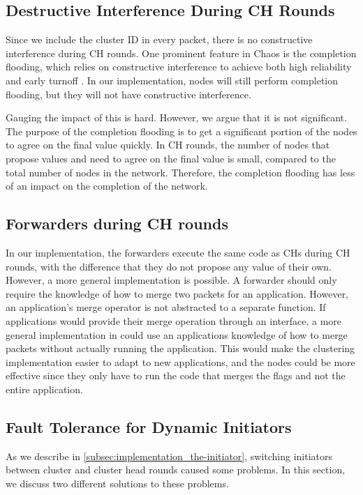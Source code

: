 \subsection{Destructive Interference During CH Rounds}
Since we include the cluster ID in every packet, there is no constructive interference during CH rounds. One prominent feature in Chaos is the completion flooding, which relies on constructive interference to achieve both high reliability and early turnoff \cite{chaos-introduction-paper}. In our implementation, nodes will still perform completion flooding, but they will not have constructive interference. 

Gauging the impact of this is hard. However, we argue that it is not significant. The purpose of the completion flooding is to get a significant portion of the nodes to agree on the final value quickly. In CH rounds, the number of nodes that propose values and need to agree on the final value is small, compared to the total number of nodes in the network. Therefore, the completion flooding has less of an impact on the completion of the network.

\subsection{Forwarders during CH rounds}
In our implementation, the forwarders execute the same code as CHs during CH rounds, with the difference that they do not propose any value of their own. However, a more general implementation is possible. A forwarder should only require the knowledge of how to merge two packets for an application. However, an application's merge operator is not abstracted to a separate function. If applications would provide their merge operation through an interface, a more general implementation in \atwo{} could use an applications knowledge of how to merge packets without actually running the application. This would make the clustering implementation easier to adapt to new applications, and the nodes could be more effective since they only have to run the code that merges the flags and not the entire application.


\subsection{Fault Tolerance for Dynamic Initiators}
\label{subsec:implementation_discussion-the-initiator}
As we describe in \cref{subsec:implementation_the-initiator}, switching initiators between cluster and cluster head rounds caused some problems. In this section, we discuss two different solutions to these problems.


